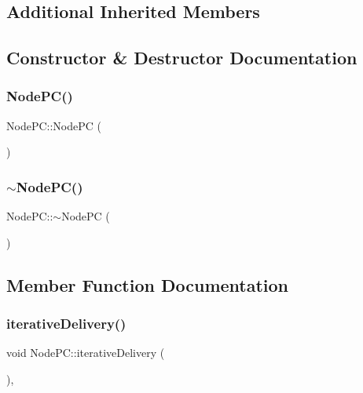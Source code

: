 \subsection*{Additional Inherited Members}


\subsection{Constructor \& Destructor Documentation}
\mbox{\label{class_node_p_c_a0b937d3f3d409fd1a8d1c15170d97675}} 
\subsubsection{\texorpdfstring{Node\+P\+C()}{NodePC()}}
{\footnotesize\ttfamily Node\+P\+C\+::\+Node\+PC (\begin{DoxyParamCaption}{ }\end{DoxyParamCaption})}

\mbox{\label{class_node_p_c_a823ec7244202157115f6d587c0c565dc}} 
\subsubsection{\texorpdfstring{$\sim$\+Node\+P\+C()}{~NodePC()}}
{\footnotesize\ttfamily Node\+P\+C\+::$\sim$\+Node\+PC (\begin{DoxyParamCaption}{ }\end{DoxyParamCaption})\hspace{0.3cm}{\ttfamily [virtual]}}



\subsection{Member Function Documentation}
\mbox{\label{class_node_p_c_a7ac363db597ebadd3b18dd4343440aa1}} 
\subsubsection{\texorpdfstring{iterative\+Delivery()}{iterativeDelivery()}}
{\footnotesize\ttfamily void Node\+P\+C\+::iterative\+Delivery (\begin{DoxyParamCaption}{ }\end{DoxyParamCaption})\hspace{0.3cm}{\ttfamily [protected]}, {\ttfamily [virtual]}}



